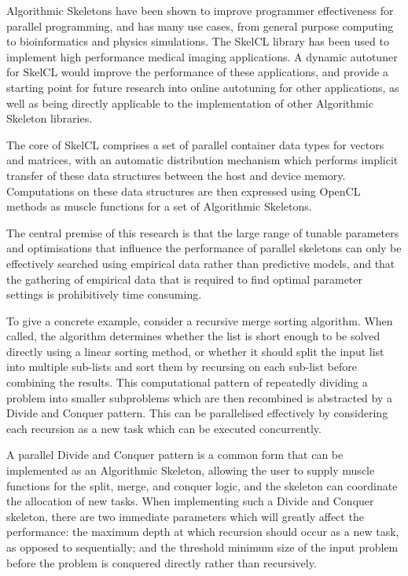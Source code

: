 Algorithmic Skeletons have been shown to improve programmer
effectiveness for parallel programming, and has many use cases, from
general purpose computing to bioinformatics and physics
simulations. The SkelCL library has been used to implement high
performance medical imaging applications. A dynamic autotuner for
SkelCL would improve the performance of these applications, and
provide a starting point for future research into online autotuning
for other applications, as well as being directly applicable to the
implementation of other Algorithmic Skeleton libraries.

The core of SkelCL comprises a set of parallel container data types
for vectors and matrices, with an automatic distribution mechanism
which performs implicit transfer of these data structures between the
host and device memory. Computations on these data structures are then
expressed using OpenCL methods as muscle functions for a set of
Algorithmic Skeletons.


The central premise of this research is that the large range of
tunable parameters and optimisations that influence the performance of
parallel skeletons can only be effectively searched using empirical
data rather than predictive models, and that the gathering of
empirical data that is required to find optimal parameter settings is
prohibitively time consuming.

To give a concrete example, consider a recursive merge sorting
algorithm. When called, the algorithm determines whether the list is
short enough to be solved directly using a linear sorting method, or
whether it should split the input list into multiple sub-lists and
sort them by recursing on each sub-list before combining the
results. This computational pattern of repeatedly dividing a problem
into smaller subproblems which are then recombined is abstracted by a
Divide and Conquer pattern. This can be parallelised effectively by
considering each recursion as a new task which can be executed
concurrently.

A parallel Divide and Conquer pattern is a common form that can be
implemented as an Algorithmic Skeleton, allowing the user to supply
muscle functions for the split, merge, and conquer logic, and the
skeleton can coordinate the allocation of new tasks. When implementing
such a Divide and Conquer skeleton, there are two immediate parameters
which will greatly affect the performance: the maximum depth at which
recursion should occur as a new task, as opposed to sequentially; and
the threshold minimum size of the input problem before the problem is
conquered directly rather than recursively.

